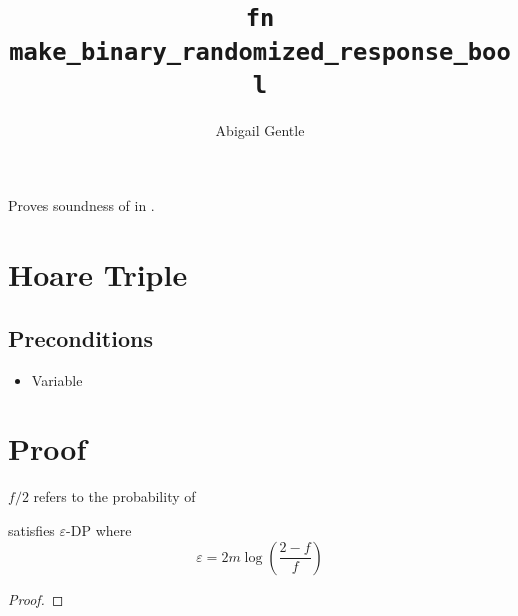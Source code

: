 \documentclass{article}
\title{\texttt{fn make\_binary\_randomized\_response\_bool}}
\author{Abigail Gentle}
\begin{document}
\maketitle

\contrib

Proves soundness of  in .

\section{Hoare Triple}
\subsection{Preconditions}
\begin{itemize}
	\item Variable 
\end{itemize}


\section{Proof}
$f/2$ refers to the probability of 
\begin{theorem}
	 satisfies $\varepsilon$-DP where 
	\begin{equation}
		\varepsilon = 2m\log\left(\frac{2-f}{f}\right)
	\end{equation}
\end{theorem}
\begin{lemma}
	
\end{lemma}
\begin{proof}
	
\end{proof}
\end{document}

